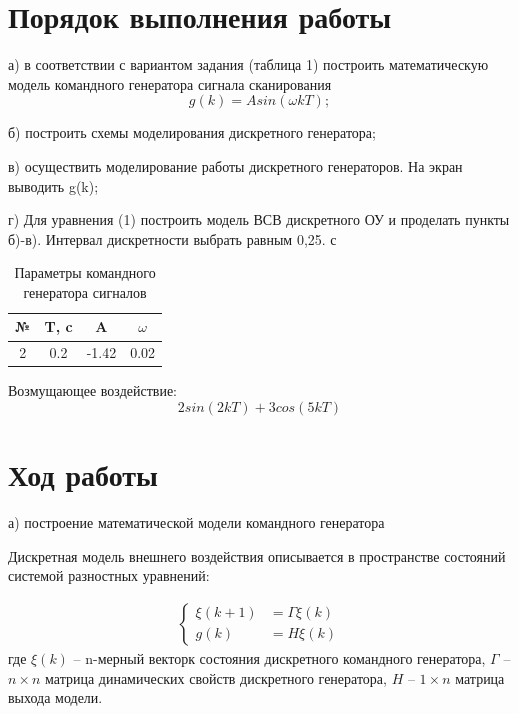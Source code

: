 \documentclass[a4paper,14pt]{extreport}
\begin{document}
\section{Порядок выполнения работы}

а) в соответствии с вариантом задания (таблица 1) построить математическую
модель командного генератора сигнала сканирования 
\begin{equation*}
	g(k) = A sin(\omega k T);
\end{equation*}

б) построить схемы моделирования дискретного генератора;

в) осуществить моделирование работы дискретного генераторов. На экран выводить
g(k);

г) Для уравнения (1) построить модель ВСВ дискретного ОУ и проделать пункты б)-в). Интервал дискретности выбрать равным 0,25. 
с
\begin{table}[H]
	\centering
	\caption{Параметры командного генератора сигналов}
	\label{my-label}
	\begin{tabular}{|c|c|c|c|}
		\hline
		№ & T, c & A     & $\omega$ \\ \hline
		2 & 0.2  & -1.42 & 0.02     \\ \hline
	\end{tabular}
\end{table}

Возмущающее воздействие:
\begin{equation}
	2 sin(2 k T) + 3 cos(5 k T)
\end{equation}

\section{Ход работы}

а) построение математической модели командного генератора

Дискретная модель внешнего воздействия описывается в пространстве
состояний системой разностных уравнений:

\begin{align*}
\begin{cases}
	\xi(k+1) &= \Gamma \xi(k)\\
g(k) &= H\xi(k)
\end{cases}
\end{align*}
где $\xi(k)$ -- n-мерный векторк состояния дискретного командного генератора, $\Gamma$ -- $n \times n$ матрица динамических свойств дискретного генератора, $H$ -- $1 \times n$ матрица выхода модели.
\end{document}
